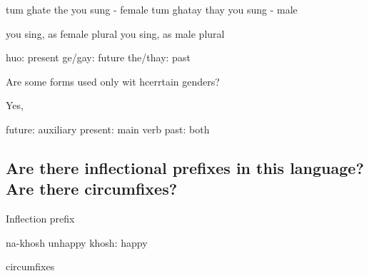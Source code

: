 \documentclass{article}
\begin{document}
tum ghate the 		you sung - female
tum ghatay thay 	you sung - male

you sing, as female plural
you sing, as male plural

huo: present
ge/gay: future
the/thay: past

Are some forms used only wit hcerrtain genders?

Yes,

future: auxiliary
present: main verb
past: both




\subsection{Are there \textbf{inflectional prefixes} in this language? Are there circumfixes?}

Inflection prefix

na-khosh 	unhappy
khosh: happy

circumfixes
\end{document}
